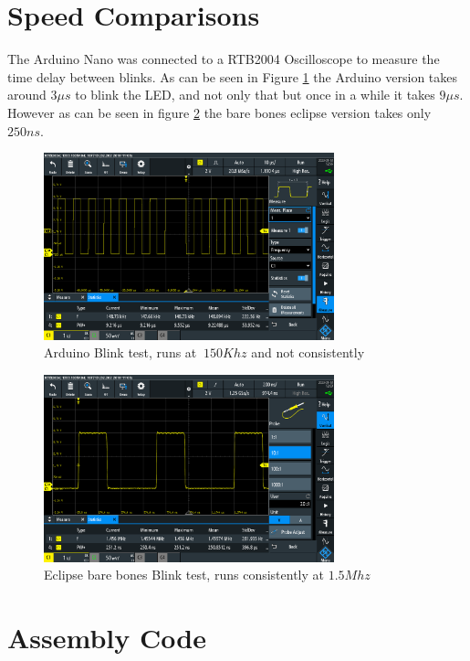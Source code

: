 \documentclass{article}
\begin{document}
\section{Speed Comparisons}

The Arduino Nano was connected to a RTB2004 Oscilloscope to measure the time delay between blinks. As can be seen in Figure \ref{hw1:fig:arduino} the Arduino version takes around $3\mu s$ to blink the LED, and not only that but once in a while it takes $9\mu s$. However as can be seen in figure \ref{hw1:fig:eclipse} the bare bones eclipse version takes only $250 ns$.

\begin{figure}[h]
    \centering
    \includegraphics[width=0.75\textwidth]{HW1/ArduinoBlink.PNG}
    \caption{Arduino Blink test, runs at $~150 Khz$ and not consistently}
    \label{hw1:fig:arduino}
\end{figure}


\begin{figure}[h]
    \centering
    \includegraphics[width=0.75\textwidth]{HW1/EclipseBlink.PNG}
    \caption{Eclipse bare bones Blink test, runs consistently at $1.5 Mhz$}
    \label{hw1:fig:eclipse}
\end{figure}


\section{Assembly Code}
\end{document}
